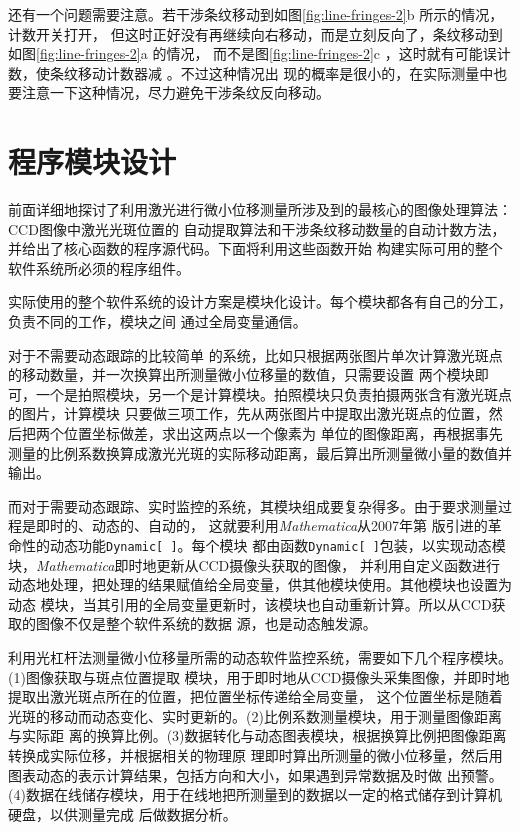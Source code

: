 \documentclass[UTF8,a4paper,12pt]{article}
\begin{document}
还有一个问题需要注意。若干涉条纹移动到如图\;\ref{fig:line-fringes-2}b 所示的情况，计数开关打开，
但这时正好没有再继续向右移动，而是立刻反向了，条纹移动到如图\;\ref{fig:line-fringes-2}a 的情况，
而不是图\;\ref{fig:line-fringes-2}c ，这时就有可能误计数，使条纹移动计数器减 。不过这种情况出
现的概率是很小的，在实际测量中也要注意一下这种情况，尽力避免干涉条纹反向移动。

\section{程序模块设计}
前面详细地探讨了利用激光进行微小位移测量所涉及到的最核心的图像处理算法：CCD图像中激光光斑位置的
自动提取算法和干涉条纹移动数量的自动计数方法，并给出了核心函数的程序源代码。下面将利用这些函数开始
构建实际可用的整个软件系统所必须的程序组件。

实际使用的整个软件系统的设计方案是模块化设计。每个模块都各有自己的分工，负责不同的工作，模块之间
通过全局变量通信。

对于不需要动态跟踪的比较简单
的系统，比如只根据两张图片单次计算激光斑点的移动数量，并一次换算出所测量微小位移量的数值，只需要设置
两个模块即可，一个是拍照模块，另一个是计算模块。拍照模块只负责拍摄两张含有激光斑点的图片，计算模块
只要做三项工作，先从两张图片中提取出激光斑点的位置，然后把两个位置坐标做差，求出这两点以一个像素为
单位的图像距离，再根据事先测量的比例系数换算成激光光斑的实际移动距离，最后算出所测量微小量的数值并
输出。

而对于需要动态跟踪、实时监控的系统，其模块组成要复杂得多。由于要求测量过程是即时的、动态的、自动的，
这就要利用\textit{Mathematica}从2007年第 版引进的革命性的动态功能\verb|Dynamic[ ]|。每个模块
都由函数\verb|Dynamic[ ]|包装，以实现动态模块，\textit{Mathematica}即时地更新从CCD摄像头获取的图像，
并利用自定义函数进行动态地处理，把处理的结果赋值给全局变量，供其他模块使用。其他模块也设置为动态
模块，当其引用的全局变量更新时，该模块也自动重新计算。所以从CCD获取的图像不仅是整个软件系统的数据
源，也是动态触发源。

利用光杠杆法测量微小位移量所需的动态软件监控系统，需要如下几个程序模块。(1)图像获取与斑点位置提取
模块，用于即时地从CCD摄像头采集图像，并即时地提取出激光斑点所在的位置，把位置坐标传递给全局变量，
这个位置坐标是随着光斑的移动而动态变化、实时更新的。(2)比例系数测量模块，用于测量图像距离与实际距
离的换算比例。(3)数据转化与动态图表模块，根据换算比例把图像距离转换成实际位移，并根据相关的物理原
理即时算出所测量的微小位移量，然后用图表动态的表示计算结果，包括方向和大小，如果遇到异常数据及时做
出预警。(4)数据在线储存模块，用于在线地把所测量到的数据以一定的格式储存到计算机硬盘，以供测量完成
后做数据分析。
\end{document}
